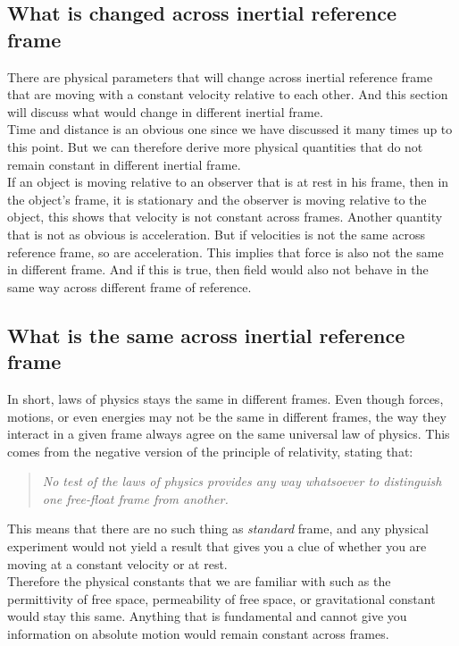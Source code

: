 \documentclass[11pt,letterpaper]{book}
\begin{document}
\subsection{What is changed across inertial reference frame}
There are physical parameters that will change across inertial reference frame that are moving with a constant velocity relative to each other. And this section will discuss what would change in different inertial frame.\\

Time and distance is an obvious one since we have discussed it many times up to this point. But we can therefore derive more physical quantities that do not remain constant in different inertial frame. \\

If an object is moving relative to an observer that is at rest in his frame, then in the object's frame, it is stationary and the observer is moving relative to the object, this shows that velocity is not constant across frames. Another quantity that is not as obvious is acceleration. But if velocities is not the same across reference frame, so are acceleration. This implies that force is also not the same in different frame. And if this is true, then field would also not behave in the same way across different frame of reference. 
\subsection{What is the same across inertial reference frame}
In short, laws of physics stays the same in different frames. Even though forces, motions, or even energies may not be the same in different frames, the way they interact in a given frame always agree on the same universal law of physics. This comes from the negative version of the principle of relativity, stating that:
\begin{quote}
    \textit{No test of the laws of physics provides any way whatsoever to distinguish one free-float frame from another.}
\end{quote}
This means that there are no such thing as \textit{standard} frame, and any physical experiment would not yield a result that gives you a clue of whether you are moving at a constant velocity or at rest. \\

Therefore the physical constants that we are familiar with such as the permittivity of free space, permeability of free space, or gravitational constant would stay this same. Anything that is fundamental and cannot give you information on absolute motion would remain constant across frames. 
\end{document}
